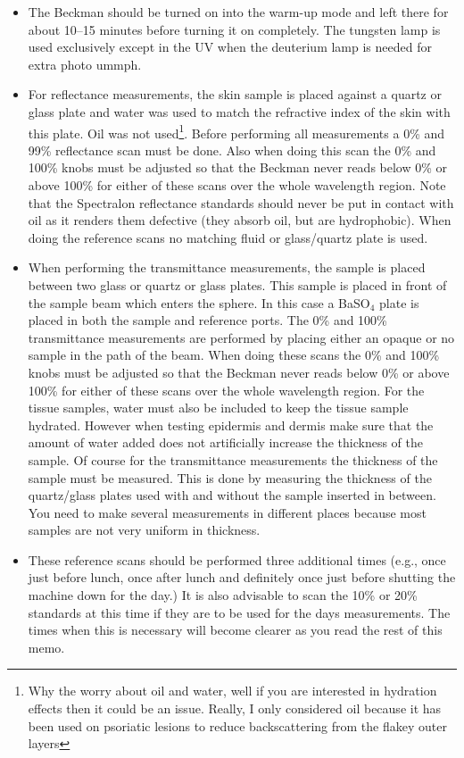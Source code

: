 \documentclass{article}
\begin{document}
\begin{itemize}

\item
The Beckman should be turned on into the warm-up mode and left there for about 10--15
minutes before turning it on completely. The tungsten lamp is used exclusively except
in the UV when the deuterium lamp is needed for extra photo ummph.

\item
For reflectance measurements, the skin sample is placed against a quartz or glass plate
and water was used to match the refractive index of the skin with this plate. Oil was
not used\footnote{Why the worry about oil and water, well if you are interested in
hydration effects then it could be an issue.  Really, I only considered oil because
it has been used on psoriatic lesions to reduce backscattering from the flakey 
outer layers}. Before performing all measurements a 0\% and 99\% reflectance scan must be done. Also
when doing this scan the 0\% and 100\% knobs must be adjusted so that the Beckman never
reads below 0\% or above 100\% for either of these scans over the whole wavelength
region.  Note that the Spectralon reflectance standards should never be put in contact
with oil as it renders them defective (they absorb oil, but are hydrophobic). 
When doing the reference scans no matching fluid
or glass/quartz plate is used.

\item
When performing the transmittance measurements, the sample is placed between two glass or
quartz or glass plates. This sample is placed in front of the sample beam which enters
the sphere. In this case a BaSO$_4$ plate is placed in both the sample and reference
ports. The 0\% and 100\% transmittance measurements are performed by placing either an opaque
or no sample in the path of the beam. When doing these scans the 0\% and 100\% knobs
must be adjusted so that the Beckman never reads below 0\% or above 100\% for either of
these scans over the whole wavelength region. For the tissue samples, water must also be
included to keep the tissue sample hydrated. However when testing epidermis and dermis
make sure that the amount of water added does not artificially increase the thickness
of the sample. Of course for the transmittance measurements the thickness of the sample
must be measured. This is done by measuring the thickness of the quartz/glass plates
used with and without the sample inserted in between.  You need to make several 
measurements in different places because most samples are not very uniform in thickness.

\item
These reference scans should be performed three additional times (e.g., once just before
lunch, once after lunch and definitely once just before shutting the machine down for the
day.) It is also advisable to scan the 10\% or 20\% standards at this time if they are
to be used for the days measurements. The times when this is necessary will become
clearer as you read the rest of this memo.


\end{itemize}
\end{document}
